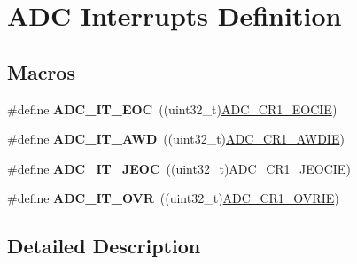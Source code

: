 \hypertarget{group___a_d_c__interrupts__definition}{}\section{A\+DC Interrupts Definition}
\label{group___a_d_c__interrupts__definition}
\subsection*{Macros}
\begin{DoxyCompactItemize}
\item 
\#define {\bfseries A\+D\+C\+\_\+\+I\+T\+\_\+\+E\+OC}~((uint32\+\_\+t)\hyperlink{group___peripheral___registers___bits___definition_gaa39fee2e812a7ca45998cccf32e90aea}{A\+D\+C\+\_\+\+C\+R1\+\_\+\+E\+O\+C\+IE})\hypertarget{group___a_d_c__interrupts__definition_ga0ad335d835f54415194d448019569e00}{}\label{group___a_d_c__interrupts__definition_ga0ad335d835f54415194d448019569e00}

\item 
\#define {\bfseries A\+D\+C\+\_\+\+I\+T\+\_\+\+A\+WD}~((uint32\+\_\+t)\hyperlink{group___peripheral___registers___bits___definition_gacd44f86b189696d5a3780342516de722}{A\+D\+C\+\_\+\+C\+R1\+\_\+\+A\+W\+D\+IE})\hypertarget{group___a_d_c__interrupts__definition_ga2f5c7f9900c24250a0c6ccaa7cbca946}{}\label{group___a_d_c__interrupts__definition_ga2f5c7f9900c24250a0c6ccaa7cbca946}

\item 
\#define {\bfseries A\+D\+C\+\_\+\+I\+T\+\_\+\+J\+E\+OC}~((uint32\+\_\+t)\hyperlink{group___peripheral___registers___bits___definition_ga5c46fc1dc6c63acf88821f46a8f6d5e7}{A\+D\+C\+\_\+\+C\+R1\+\_\+\+J\+E\+O\+C\+IE})\hypertarget{group___a_d_c__interrupts__definition_gad439fc0cd69706704d47aeabfeddb631}{}\label{group___a_d_c__interrupts__definition_gad439fc0cd69706704d47aeabfeddb631}

\item 
\#define {\bfseries A\+D\+C\+\_\+\+I\+T\+\_\+\+O\+VR}~((uint32\+\_\+t)\hyperlink{group___peripheral___registers___bits___definition_gaa892fda7c204bf18a33a059f28be0fba}{A\+D\+C\+\_\+\+C\+R1\+\_\+\+O\+V\+R\+IE})\hypertarget{group___a_d_c__interrupts__definition_gac3852b7789860e0ea79b82115ab877a0}{}\label{group___a_d_c__interrupts__definition_gac3852b7789860e0ea79b82115ab877a0}

\end{DoxyCompactItemize}


\subsection{Detailed Description}
